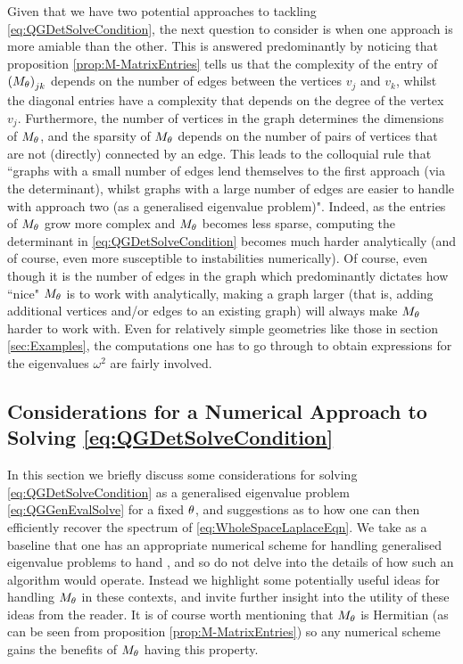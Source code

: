 Given that we have two potential approaches to tackling \eqref{eq:QGDetSolveCondition}, the next question to consider is when one approach is more amiable than the other.
This is answered predominantly by noticing that proposition \ref{prop:M-MatrixEntries} tells us that the complexity of the entry of $\left( M_\theta \right)_{jk}$ depends on the number of edges between the vertices $v_j$ and $v_k$, whilst the diagonal entries have a complexity that depends on the degree of the vertex $v_j$.
Furthermore, the number of vertices in the graph determines the dimensions of $M_\theta$, and the sparsity of $M_\theta$ depends on the number of pairs of vertices that are not (directly) connected by an edge.
This leads to the colloquial rule that ``graphs with a small number of edges lend themselves to the first approach (via the determinant), whilst graphs with a large number of edges are easier to handle with approach two (as a generalised eigenvalue problem)".
Indeed, as the entries of $M_\theta$ grow more complex and $M_\theta$ becomes less sparse, computing the determinant in \eqref{eq:QGDetSolveCondition} becomes much harder analytically (and of course, even more susceptible to instabilities numerically).
Of course, even though it is the number of edges in the graph which predominantly dictates how ``nice" $M_\theta$ is to work with analytically, making a graph larger (that is, adding additional vertices and/or edges to an existing graph) will always make $M_\theta$ harder to work with.
Even for relatively simple geometries like those in section \ref{sec:Examples}, the computations one has to go through to obtain expressions for the eigenvalues $\omega^2$ are fairly involved.

\subsection{Considerations for a Numerical Approach to Solving \eqref{eq:QGDetSolveCondition}} \label{ssec:NumericalApproachConsiderations}
In this section we briefly discuss some considerations for solving \eqref{eq:QGDetSolveCondition} as a generalised eigenvalue problem \eqref{eq:QGGenEvalSolve} for a fixed $\theta$, and suggestions as to how one can then efficiently recover the spectrum of \eqref{eq:WholeSpaceLaplaceEqn}.
We take as a baseline that one has an appropriate numerical scheme for handling generalised eigenvalue problems to hand , and so do not delve into the details of how such an algorithm would operate.
Instead we highlight some potentially useful ideas for handling $M_\theta$ in these contexts, and invite further insight into the utility of these ideas from the reader.
It is of course worth mentioning that $M_\theta$ is Hermitian (as can be seen from proposition \ref{prop:M-MatrixEntries}) so any numerical scheme gains the benefits of $M_\theta$ having this property. \newline

